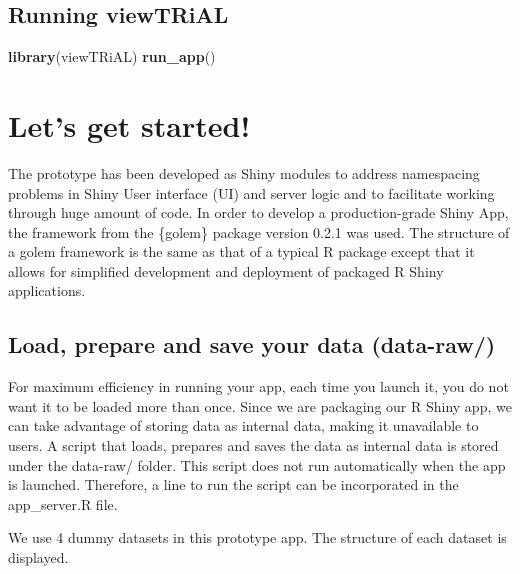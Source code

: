 \documentclass[]{article}
\newenvironment{Shaded}{\begin{snugshade}}{\end{snugshade}}
\newcommand{\KeywordTok}[1]{\textcolor[rgb]{0.13,0.29,0.53}{\textbf{#1}}}
\newcommand{\NormalTok}[1]{#1}
\begin{document}
\hypertarget{running-viewtrial}{%
\subsection{Running viewTRiAL}\label{running-viewtrial}}

\begin{Shaded}
\begin{Highlighting}[]

\KeywordTok{library}\NormalTok{(viewTRiAL)}
\KeywordTok{run_app}\NormalTok{()}
\end{Highlighting}
\end{Shaded}

\hypertarget{lets-get-started}{%
\section{\texorpdfstring{\textbf{Let's get
started!}}{Let's get started!}}\label{lets-get-started}}

The prototype has been developed as Shiny modules to address namespacing
problems in Shiny User interface (UI) and server logic and to facilitate
working through huge amount of code. In order to develop a
production-grade Shiny App, the framework from the \{golem\} package
version 0.2.1 was used. The structure of a golem framework is the same
as that of a typical R package except that it allows for simplified
development and deployment of packaged R Shiny applications.

\hypertarget{load-prepare-and-save-your-data-data-raw}{%
\subsection{\texorpdfstring{\textbf{Load, prepare and save your data}
(data-raw/)}{Load, prepare and save your data (data-raw/)}}\label{load-prepare-and-save-your-data-data-raw}}

For maximum efficiency in running your app, each time you launch it, you
do not want it to be loaded more than once. Since we are packaging our R
Shiny app, we can take advantage of storing data as internal data,
making it unavailable to users. A script that loads, prepares and saves
the data as internal data is stored under the data-raw/ folder. This
script does not run automatically when the app is launched. Therefore, a
line to run the script can be incorporated in the app\_server.R file.

We use 4 dummy datasets in this prototype app. The structure of each
dataset is displayed.
\end{document}
